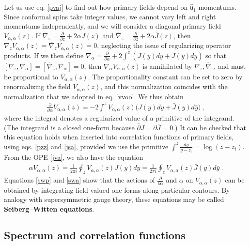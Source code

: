 \documentclass[12pt, a4paper, notitlepage, twoside]{report}
\numberwithin{equation}{section}
\theoremstyle{break}
\begin{document}
Let us use eq. \eqref{pvaj} to find out how primary fields depend on $\hat{\mathfrak{u}}_1$ momentums. 
Since conformal spins take integer values, we cannot vary left and right momentums independently, and we will consider a diagonal primary field $V_{\alpha,\alpha}(z)$. 
If $\nabla_z={\frac{\partial}{\partial z}} +2\alpha J(z)$ and $\overline{\nabla}_{z}={\frac{\partial}{\partial \bar z}} +2\alpha \bar J(z)$, then $\nabla_z V_{\alpha,\alpha}(z)=\overline{\nabla}_z V_{\alpha,\alpha}(z)=0$, neglecting the issue of regularizing operator products.
If we then define $\nabla_\alpha = {\frac{\partial}{\partial \alpha}}+2\int^z (J(y)dy +\bar J(y)d\bar y)$ so that $[\nabla_z,\nabla_\alpha]=[\overline{\nabla}_z,\nabla_\alpha]=0$, then $\nabla_\alpha V_{\alpha,\alpha}(z)$ is annihilated by $\nabla_z,\overline{\nabla}_z$, and must be proportional to $V_{\alpha,\alpha}(z)$.
The proportionality constant can be set to zero by renormalizing the field $V_{\alpha,\alpha}(z)$, and this normalization coincides with the normalization that we adopted in eq. \eqref{vvoo}.
We thus obtain
\begin{align}
 {\frac{\partial}{\partial \alpha}} V_{\alpha,\alpha}(z) 
 = -2 \int^z V_{\alpha,\alpha}(z)\Big(J(y)dy+\bar J(y)d\bar y \Big)\ ,
\label{swp}
\end{align}
where the integral denotes a regularized value of a primitive of the integrand. (The integrand is a closed one-form because $\bar\partial J = \partial \bar J=0$.)
It can be checked that this equation holds when inserted into correlation functions of primary fields, using eqs. \eqref{pzz} and \eqref{jsa}, provided we use the primitive $\int^z \frac{dy}{y-z_i} = \log(z-z_i)$.
From the OPE \eqref{jva}, we also have the equation
\begin{align}
 \alpha V_{\alpha,\alpha}(z) 
 = \frac{1}{2\pi i} \oint_{z} V_{\alpha,\alpha}(z)J(y)dy
 = \frac{1}{2\pi i} \oint_{z} V_{\alpha,\alpha}(z)\bar J(y)d\bar y\ .
\label{swa}
\end{align}
Equations \eqref{swp} and \eqref{swa} show that the actions of ${\frac{\partial}{\partial \alpha}}$ and $\alpha$ on $V_{\alpha,\alpha}(z)$ can be obtained by integrating field-valued one-forms along particular contours.
By analogy with supersymmetric gauge theory, these equations may be called \textbf{\boldmath Seiberg--Witten equations}. 


\subsection{Spectrum and correlation functions \label{secsacf}}
\end{document}
